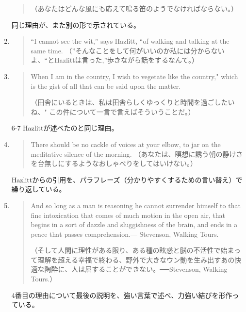 \begin{enumerate}
\begin{quote}
         （あなたはどんな風にも応えて鳴る笛のようでなければならない。）
     \end{quote}
     同じ理由が、また別の形で示されている。
     \item 
     \begin{quote}
         ``I cannot see the wit,'' says Hazlitt, ``of walking and talking
at the same time.
（''そんなことをして何がいいのか私には分からないよ、``とHazlittは言った,''歩きながら話をするなんて。）
     \end{quote}
     \item 
     \begin{quote}
         When I am in the country, I wish to vegetate like the country,"
which is the gist of all that can be said upon the matter.

（田舎にいるときは、私は田舎らしくゆっくりと時間を過ごしたいね、"
この件について一言で言えばそういうことだ。）
     \end{quote}
     6-7 Hazlittが述べたのと同じ理由。
     \item 
     \begin{quote}
         There should be no cackle of voices at your elbow, to jar on the
meditative silence of the morning.
（あなたは、瞑想に誘う朝の静けさを台無しにするようなおしゃべりをしてはいけない。）
     \end{quote}
     Hazlittからの引用を、パラフレーズ（分かりやすくするための言い替え）で繰り返している。
     \item
     \begin{quote}
         And so long as a man is reasoning he cannot surrender himself to
that fine intoxication that comes of much motion in the open air, that
begins in a sort of dazzle and sluggishness of the brain, and ends in a
peace that passes comprehension.--- Stevenson, Walking Tours.

（そして人間に理性がある限り、ある種の眩惑と脳の不活性で始まって理解を超える幸福で終わる、野外で大きなウン動を生み出すあの快適な陶酔に、人は屈することができない。──Stevenson,
Walking Tours.）
     \end{quote}
     4番目の理由について最後の説明を、強い言葉で述べ、力強い結びを形作っている。
\end{enumerate}
